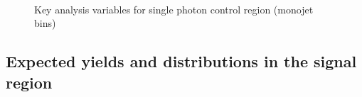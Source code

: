 \begin{figure}[!h]
\begin{center}
         \\
        \caption{Key analysis variables for single photon control region (monojet bins)}
        \label{fig:distribution_singlephoton_mono}
    \end{center}
\end{figure}

\newpage
\subsection{Expected yields and distributions in the signal region}



